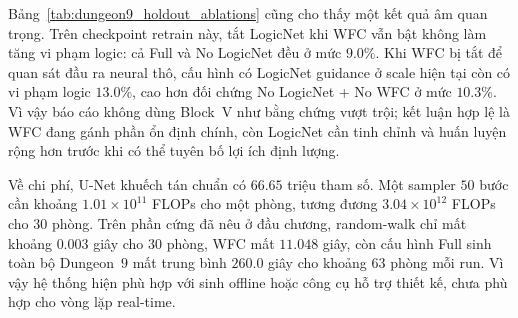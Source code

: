 \documentclass[oneside,a4paper,12pt]{extreport}
\begin{document}
\begin{table}[H]
\centering
\small
\setlength{\tabcolsep}{5pt}
\caption{Ablation neural trên đồ thị holdout Dungeon 9}
\label{tab:dungeon9_holdout_ablations}
\end{table}

Bảng~\ref{tab:dungeon9_holdout_ablations} cũng cho thấy một kết quả âm quan trọng. Trên checkpoint retrain này, tắt LogicNet khi WFC vẫn bật không làm tăng vi phạm logic: cả Full và No LogicNet đều ở mức $9.0\%$. Khi WFC bị tắt để quan sát đầu ra neural thô, cấu hình có LogicNet guidance ở scale hiện tại còn có vi phạm logic $13.0\%$, cao hơn đối chứng No LogicNet + No WFC ở mức $10.3\%$. Vì vậy báo cáo không dùng Block~V như bằng chứng vượt trội; kết luận hợp lệ là WFC đang gánh phần ổn định chính, còn LogicNet cần tinh chỉnh và huấn luyện rộng hơn trước khi có thể tuyên bố lợi ích định lượng.

Về chi phí, U-Net khuếch tán chuẩn có $66.65$ triệu tham số. Một sampler $50$ bước cần khoảng $1.01\times 10^{11}$ FLOPs cho một phòng, tương đương $3.04\times 10^{12}$ FLOPs cho $30$ phòng. Trên phần cứng đã nêu ở đầu chương, random-walk chỉ mất khoảng $0.003$ giây cho $30$ phòng, WFC mất $11.048$ giây, còn cấu hình Full sinh toàn bộ Dungeon~$9$ mất trung bình $260.0$ giây cho khoảng $63$ phòng mỗi run. Vì vậy hệ thống hiện phù hợp với sinh offline hoặc công cụ hỗ trợ thiết kế, chưa phù hợp cho vòng lặp real-time.
\end{document}
